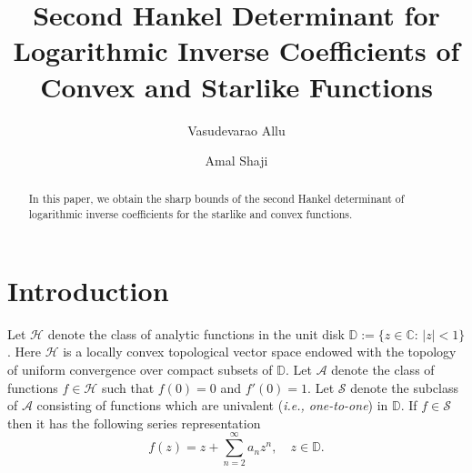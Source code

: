 \documentclass[a4paper,12pt]{amsart}
\theoremstyle{definition}
\numberwithin{equation}{section}
\begin{document}

\title[Second Hankel determinant of logarithmic inverse coefficients]{Second Hankel Determinant for Logarithmic Inverse Coefficients of Convex and Starlike Functions}
\author[Vasudevarao Allu]{Vasudevarao Allu}
\address{Vasudevarao Allu, School of Basic Sciences, Indian Institute of Technology Bhubaneswar,
Bhubaneswar-752050, Odisha, India.}
\author[Amal Shaji]{Amal Shaji}
\address{Amal Shaji, School of Basic Sciences, Indian Institute of Technology Bhubaneswar,
Bhubaneswar-752050, Odisha, India.}

\begin{abstract}
In this paper, we obtain the sharp bounds of the second Hankel determinant of logarithmic  inverse coefficients  for the starlike and convex functions.
\end{abstract}

\maketitle

\section{Introduction}\label{Introduction}
Let $\mathcal{H}$ denote the class of analytic functions in the unit disk $\mathbb{D}:=\{z\in\mathbb{C}:\, |z|<1\}$. Here $\mathcal{H}$ is 
a locally convex topological vector space endowed with the topology of uniform convergence over compact subsets of $\mathbb{D}$. Let $\mathcal{A}$ denote the class of functions $f\in \mathcal{H}$ such that $f(0)=0$ and $f'(0)=1$.  Let $\mathcal{S}$ 
denote the subclass of  $\mathcal{A}$ consisting of functions which are univalent ({\em i.e., one-to-one}) in $\mathbb{D}$. 
If $f\in\mathcal{S}$ then it has the following series representation
\begin{equation}\label{f}
	f(z)= z+\sum_{n=2}^{\infty}a_n z^n, \quad z\in \mathbb{D}.
\end{equation}
\end{document}
